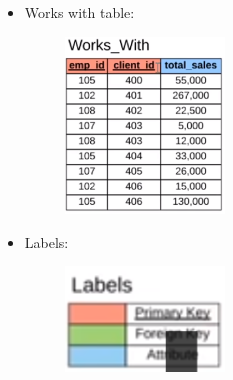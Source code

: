 \begin{itemize}
    \item Works with table:
        \begin{figure}[H]
            \centering
            \includegraphics[width=0.4\textwidth]{./figs/workswith.png}
        \end{figure}
    
    \item Labels:
        \begin{figure}[H]
            \centering
            \includegraphics[width=0.4\textwidth]{./figs/labels.png}
        \end{figure}
\end{itemize}

